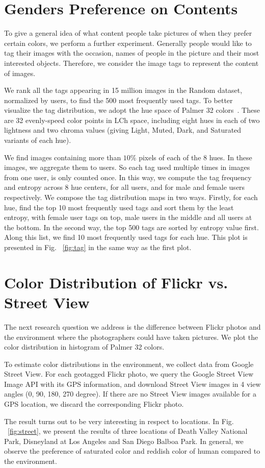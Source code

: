 \section{Genders Preference on Contents}

To give a general idea of what content people take pictures of when they prefer certain colors, we perform a further experiment. Generally people would like to tag their images with the occasion, names of people in the picture and their most interested objects. Therefore, we consider the image tags to represent the content of images.

We rank all the tags appearing in 15 million images in the Random dataset, normalized by users, to find the 500 most frequently used tags. 
To better visualize the tag distribution, we adopt the hue space of Palmer 32 colors~\cite{}. These are 32 evenly-speed color points in LCh space, including eight hues in each of two lightness and two chroma values (giving Light, Muted, Dark, and Saturated variants of each hue).

We find images containing more than $10\%$ pixels of each of the 8 hues.
In these images, we aggregate them to users. So each tag used multiple times in images from one user, is only counted once. 
In this way, we compute the tag frequency and entropy across 8 hue centers, for all users, and for male and female users respectively.
We compose the tag distribution maps in two ways.
Firstly, for each hue, find the top 10 most frequently used tags and sort them by the least entropy, with female user tags on top, male users in the middle and all users at the bottom.
In the second way, the top 500 tags are sorted by entropy value first. Along this list, we find 10 most frequently used tags for each hue. This plot is presented in Fig. ~\ref{fig:tag} in the same way as the first plot.

\section{Color Distribution of Flickr vs. Street View}
The next research question we address is the difference between Flickr photos and the environment where the photographers could have taken pictures. 
We plot the color distribution in histogram of Palmer 32 colors.

To estimate color distributions in the environment, we collect data from Google Street View.
For each geotagged Flickr photo, we query the Google Street View Image API with its GPS information, and download Street View images in 4 view angles (0, 90, 180, 270 degree). If there are no Street View images available for a GPS location, we discard the corresponding Flickr photo.

The result turns out to be very interesting in respect to locations. In Fig. ~\ref{fig:street}, we present the results of three locations of Death Valley National Park, Disneyland at Los Angeles and San Diego Balboa Park. 
In general, we observe the preference of saturated color and reddish color of human compared to the environment.
